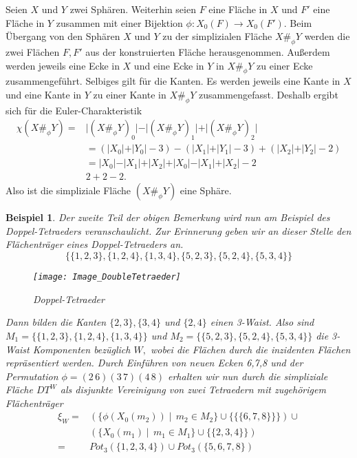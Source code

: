 \documentclass[12pt,titlepage,twoside,cleardoublepage]{article}
\theoremstyle{nummermitklammern}
\newtheorem{bsp}[temp]{Beispiel}
\newtheorem{bsp}[zahl]{Beispiel}
\numberwithin{equation}{section}
\begin{document}
Seien $X$ und $Y$ zwei Sphären. Weiterhin seien  $F$ eine Fläche in $X$ und $F'$ eine Fläche in $Y$ zusammen mit einer Bijektion $\phi :X_0(F)\to X_0(F').$ Beim Übergang von den Sphären $X$ und $Y$ zu der simplizialen Fläche $X\#_\phi Y$ werden die zwei Flächen $F,F'$ aus der konstruierten Fläche herausgenommen. Außerdem werden jeweils eine Ecke in $X$ und eine Ecke in $Y$ in $X\#_\phi Y$ zu einer Ecke zusammengeführt. Selbiges gilt für die Kanten. Es werden jeweils eine Kante in $X$ und eine Kante in $Y$ zu einer Kante in $X\#_\phi Y$ zusammengefasst. Deshalb ergibt sich für die Euler-Charakteristik
\begin{align*}
\chi(X\#_\phi Y)=&\vert(X\#_\phi Y)_0\vert -\vert (X\#_\phi Y)_1\vert +\vert (X\#_\phi Y)_2\vert\\
&=(\vert X_0\vert+\vert Y_0\vert-3)-(\vert X_1\vert+\vert Y_1\vert-3)+(\vert X_2\vert+\vert Y_2\vert-2)\\ 
&=\vert X_0\vert-\vert X_1\vert+\vert X_2\vert+\vert X_0\vert-\vert X_1\vert+\vert X_2\vert-2\\
&2+2-2.
\end{align*}
Also ist die simpliziale Fläche $(X\#_\phi Y)$ eine Sphäre. 
\begin{bsp}
Der zweite Teil der obigen Bemerkung wird nun am Beispiel des Doppel-Tetraeders veranschaulicht.
Zur Erinnerung geben wir an dieser Stelle den Flächenträger eines Doppel-Tetraeders an.
\[
\{\{1,2,3\},\{1,2,4\},\{1,3,4\},\{5,2,3\},\{5,2,4\},\{5,3,4\}\}
\]
\begin{figure}[H]
\begin{center}
\texttt{[image: Image\_DoubleTetraeder]}
\end{center}
\caption{Doppel-Tetraeder}
\end{figure}
Dann bilden die Kanten $\{2,3\},\{3,4\}$ und $\{2,4\}$ einen 3-Waist. Also sind $M_1=\{\{1,2,3\},\{1,2,4\},\{1,3,4\}\}$ und $M_2=\{\{5,2,3\},\{5,2,4\},\{5,3,4\}\}$ die 3-Waist Komponenten bezüglich $W,$ wobei die Flächen durch die inzidenten Flächen repräsentiert werden. Durch Einführen von neuen Ecken 6,7,8 und der Permutation $\phi=(2\, 6)(3\, 7)(4\,8)$ erhalten wir nun durch die simpliziale Fläche $DT^W$ als disjunkte Vereinigung von zwei Tetraedern mit zugehörigem Flächenträger
\begin{align*}
\xi_W=&(\{\phi(X_0(m_2))\mid \, m_2\in M_2\}\cup \{\{\{6,7,8\}\}\}) \cup \\
&(\{X_0(m_1)\mid \, m_1\in M_1\}\cup \{\{2,3,4\}\})\\
=&Pot_3(\{1,2,3,4\})\cup Pot_3(\{5,6,7,8\})
\end{align*}
\end{bsp}
\end{document}
